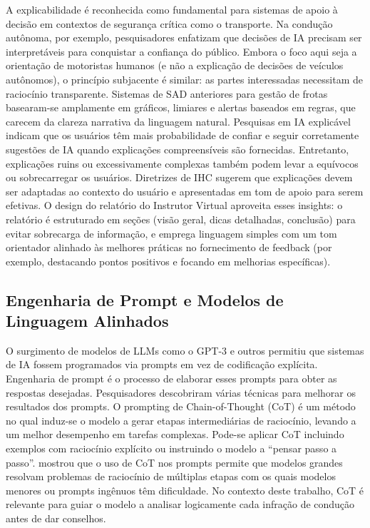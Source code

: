 \documentclass[12pt]{article}
\begin{document}
A explicabilidade é reconhecida como fundamental para sistemas de apoio à decisão em contextos de segurança crítica como o transporte. Na condução autônoma, por exemplo, pesquisadores enfatizam que decisões de IA precisam ser interpretáveis para conquistar a confiança do público. Embora o foco aqui seja a orientação de motoristas humanos (e não a explicação de decisões de veículos autônomos), o princípio subjacente é similar: as partes interessadas necessitam de raciocínio transparente. Sistemas de SAD anteriores para gestão de frotas basearam-se amplamente em gráficos, limiares e alertas baseados em regras, que carecem da clareza narrativa da linguagem natural. Pesquisas em IA explicável indicam que os usuários têm mais probabilidade de confiar e seguir corretamente sugestões de IA quando explicações compreensíveis são fornecidas. Entretanto, explicações ruins ou excessivamente complexas também podem levar a equívocos ou sobrecarregar os usuários. Diretrizes de IHC sugerem que explicações devem ser adaptadas ao contexto do usuário e apresentadas em tom de apoio para serem efetivas. O design do relatório do Instrutor Virtual aproveita esses insights: o relatório é estruturado em seções (visão geral, dicas detalhadas, conclusão) para evitar sobrecarga de informação, e emprega linguagem simples com um tom orientador alinhado às melhores práticas no fornecimento de feedback (por exemplo, destacando pontos positivos e focando em melhorias específicas). 

\subsection{Engenharia de Prompt e Modelos de Linguagem Alinhados}

O surgimento de modelos de LLMs como o GPT-3 e outros permitiu que sistemas de IA fossem programados via prompts em vez de codificação explícita. Engenharia de prompt é o processo de elaborar esses prompts para obter as respostas desejadas. Pesquisadores descobriram várias técnicas para melhorar os resultados dos prompts. O prompting de Chain-of-Thought (CoT) é um método no qual induz-se o modelo a gerar etapas intermediárias de raciocínio, levando a um melhor desempenho em tarefas complexas. Pode-se aplicar CoT incluindo exemplos com raciocínio explícito ou instruindo o modelo a “pensar passo a passo”. \cite{wei2022} mostrou que o uso de CoT nos prompts permite que modelos grandes resolvam problemas de raciocínio de múltiplas etapas com os quais modelos menores ou prompts ingênuos têm dificuldade. No contexto deste trabalho, CoT é relevante para guiar o modelo a analisar logicamente cada infração de condução antes de dar conselhos.
\end{document}
